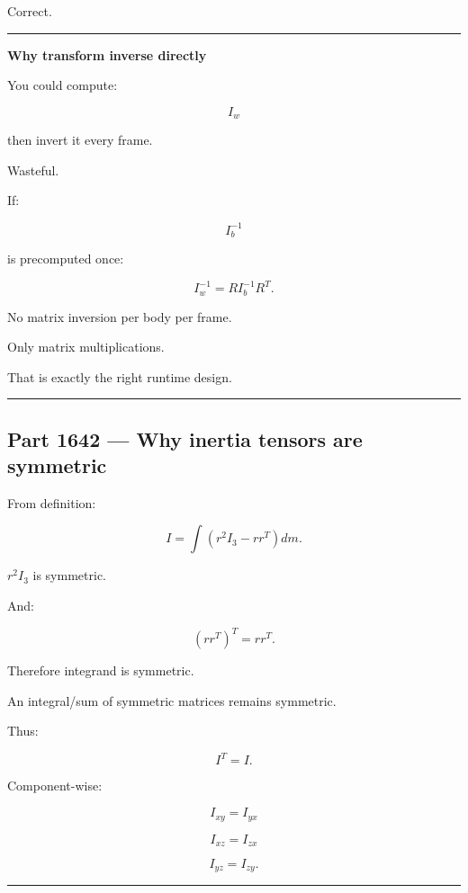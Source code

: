 Correct.

\begin{center}\rule{0.5\linewidth}{0.5pt}\end{center}

\textbf{Why transform inverse directly}

You could compute:

\[
I_w
\]

then invert it every frame.

Wasteful.

If:

\[
I_b^{-1}
\]

is precomputed once:

\[
I_w^{-1}
=
RI_b^{-1}R^T.
\]

No matrix inversion per body per frame.

Only matrix multiplications.

That is exactly the right runtime design.

\begin{center}\rule{0.5\linewidth}{0.5pt}\end{center}

\subsection{Part 1642 --- Why inertia tensors are symmetric}\label{06-engine-ii-ch035-part-1642-why-inertia-tensors-are-symmetric}

\hypertarget{06-engine-ii-ch035-part-1642-why-inertia-tensors-are-symmetric}{}

From definition:

\[
I
=
\int
(
r^2I_3
-
rr^T
)
dm.
\]

\(r^2I_3\) is symmetric.

And:

\[
(rr^T)^T
=
rr^T.
\]

Therefore integrand is symmetric.

An integral/sum of symmetric matrices remains symmetric.

Thus:

\[
\boxed{
I^T=I.
}
\]

Component-wise:

\[
I_{xy}=I_{yx}
\]

\[
I_{xz}=I_{zx}
\]

\[
I_{yz}=I_{zy}.
\]

\begin{center}\rule{0.5\linewidth}{0.5pt}\end{center}

